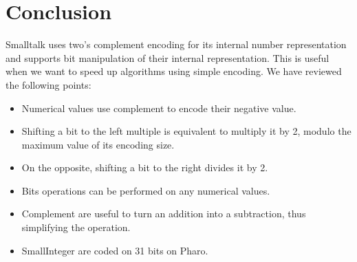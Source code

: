 \documentclass[a4paper,10pt,twoside]{book}
\begin{document}
\section{Conclusion}

Smalltalk uses two's complement encoding for its internal number representation and supports  bit manipulation of their internal representation. This is useful when we want to speed up algorithms using simple encoding. We have reviewed the following points:

\begin{itemize}
\item Numerical values use complement to encode their negative value.
\item Shifting a bit to the left multiple is equivalent to multiply it by 2, modulo the maximum value of its encoding size.
\item On the opposite, shifting a bit to the right divides it by 2.
\item Bits operations can be performed on any numerical values.
\item Complement are useful to turn an addition into a subtraction, thus simplifying the operation.
\item SmallInteger are coded on 31 bits on Pharo.
\end{itemize}

\ifx\wholebook\relax\else
   
   
\end{document}
